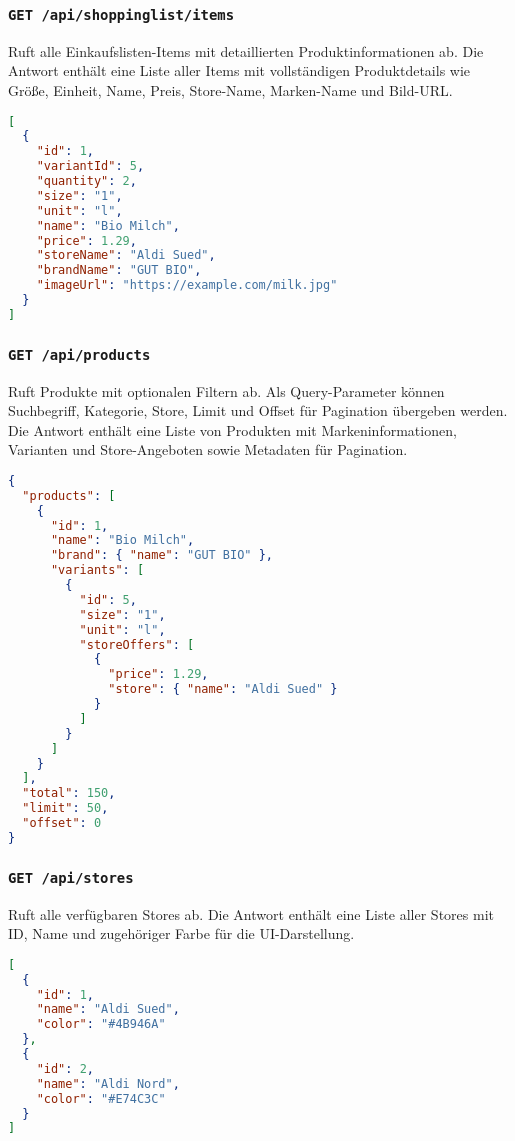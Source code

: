 \subsubsection{\texttt{GET /api/shoppinglist/items}}

Ruft alle Einkaufslisten-Items mit detaillierten Produktinformationen ab. Die Antwort enthält eine Liste aller Items mit vollständigen Produktdetails wie Größe, Einheit, Name, Preis, Store-Name, Marken-Name und Bild-URL.

\begin{lstlisting}[language=JSON]
[
  {
    "id": 1,
    "variantId": 5,
    "quantity": 2,
    "size": "1",
    "unit": "l",
    "name": "Bio Milch",
    "price": 1.29,
    "storeName": "Aldi Sued",
    "brandName": "GUT BIO",
    "imageUrl": "https://example.com/milk.jpg"
  }
]
\end{lstlisting}

\subsubsection{\texttt{GET /api/products}}

Ruft Produkte mit optionalen Filtern ab. Als Query-Parameter können Suchbegriff, Kategorie, Store, Limit und Offset für Pagination übergeben werden. Die Antwort enthält eine Liste von Produkten mit Markeninformationen, Varianten und Store-Angeboten sowie Metadaten für Pagination.

\begin{lstlisting}[language=JSON]
{
  "products": [
    {
      "id": 1,
      "name": "Bio Milch",
      "brand": { "name": "GUT BIO" },
      "variants": [
        {
          "id": 5,
          "size": "1",
          "unit": "l",
          "storeOffers": [
            {
              "price": 1.29,
              "store": { "name": "Aldi Sued" }
            }
          ]
        }
      ]
    }
  ],
  "total": 150,
  "limit": 50,
  "offset": 0
}
\end{lstlisting}

\subsubsection{\texttt{GET /api/stores}}

Ruft alle verfügbaren Stores ab. Die Antwort enthält eine Liste aller Stores mit ID, Name und zugehöriger Farbe für die UI-Darstellung.

\begin{lstlisting}[language=JSON]
[
  {
    "id": 1,
    "name": "Aldi Sued",
    "color": "#4B946A"
  },
  {
    "id": 2,
    "name": "Aldi Nord", 
    "color": "#E74C3C"
  }
]
\end{lstlisting}

